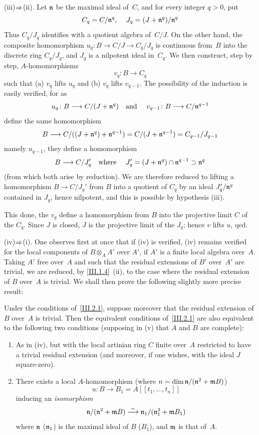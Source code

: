 (iii)$\To$(ii).
Let $\mathfrak{n}$ be the maximal ideal of~$C$, and for every integer
$q > 0$, put
$$
C_q = C/\mathfrak{n}^q \text{, \quad} J_q = (J +
\mathfrak{n}^q)/\mathfrak{n}^q
$$
Thus $C_q/J_q$ identifies with a quotient algebra of~$C/J$. On the
other hand, the composite homomorphism $u_q \colon B \to C/J \to
C_q/J_q$ is continuous from~$B$ into the discrete ring $C_q/J_q$,
and $J_q$ is a nilpotent ideal in~$C_q$. We then construct, step by
step, $A$-homomorphisms
$$
v_q \colon B \to C_q
$$
such that (a) $v_q$ lifts $u_q$ and (b) $v_q$ lifts $v_{q-1}$. The
possibility of the induction is easily verified, for as
$$
u_q \colon B \to C/(J + \goth{n}^q) \text{\quad and \quad} v_{q-1}
\colon B \to C/\goth{n}^{q-1}
$$
define the same homomorphism
$$
B \to C/((J + \goth{n}^q) + \goth{n}^{q-1}) = C/(J + \goth{n}^{q-1}) =
C_{q-1}/J_{q-1}
$$
namely $u_{q-1}$, they define a homomorphism
$$
B \to C/J_q' \text{\quad where \quad} J_q' = (J + \goth{n}^q)\cap
\goth{n}^{q-1} \supset \goth{n}^q
$$
(from which both arise by reduction). We are therefore reduced to
lifting a homomorphism $B \to C/J_q'$ from $B$ into a quotient of
$C_q$ by an ideal $J_q'/\mathfrak{n}^q$ contained in $J_q$, hence
nilpotent, and this is possible by hypothesis (iii).

This done, the $v_q$ define a homomorphism from $B$ into the projective
limit $C$ of the $C_q$. Since $J$ is closed, $J$ is the projective
limit of the $J_q$; hence $v$ lifts $u$, qed.

(iv)$\To$(i). One observes first at once that if (iv) is verified,
(iv) remains verified for the local components of $B \otimes_A A'$ over
$A'$, if $A'$ is a finite local algebra over~$A$. Taking $A'$ free
over~$A$ and such that the residual extensions of $B'$ over~$A'$ are
trivial, we are reduced, by \ref{III.1.4}~(ii), to the case where
the residual extension of $B$ over~$A$ is trivial. We shall then prove
the following slightly more precise result:

\begin{corollary}
\label{III.2.2}
Under the conditions of~\ref{III.2.1}, suppose moreover that the residual
extension of $B$ over~$A$ is trivial. Then the equivalent conditions
of~\ref{III.2.1} are also equivalent to the following two conditions
(supposing in \textup{(v)} that $A$ and $B$ are complete):
\begin{enumerate}
\item[(iv~ter)] As in \textup{(iv)}, but with the local artinian ring $C$ finite over~$A$ restricted to have a trivial residual extension (and moreover, if one wishes, with the ideal $J$ square-zero).
\item[(v)] There exists a local $A$-homomorphism (where $n = \dim{\mathfrak{n}/(\mathfrak{n}^2+\mathfrak{m}B})$)
$$
u \colon B \to B_1 = A[[t_1, \dots, t_n]]
$$
inducing an \emph{isomorphism}
$$
\mathfrak{n}/(\mathfrak{n}^2+\mathfrak{m}B) \overset{\sim}{\longrightarrow}
\mathfrak{n}_1/(\mathfrak{n}_1^2+\mathfrak{m}B_1)
$$
where $\mathfrak{n}$ ($\mathfrak{n}_1$) is the maximal ideal of $B$
($B_1$), and $\mathfrak{m}$ is that of~$A$.
\end{enumerate}
\end{corollary}

